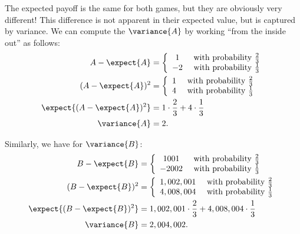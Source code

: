 The expected payoff is the same for both games, but they are obviously
very different!  This difference is not apparent in their expected value,
but is captured by variance.  We can compute the $\variance{A}$ by working
``from the inside out'' as follows:
\begin{align*}
A - \expect{A}
        & =     \left\{
                \begin{array}{cl}
                        1 & \text{ with probability } \frac{2}{3} \\
                        -2 & \text{ with probability } \frac{1}{3}
                \end{array}
                \right. \\
(A - \expect{A})^2
        & =     \left\{
                \begin{array}{cl}
                        1 & \text{ with probability } \frac{2}{3} \\
                        4 & \text{ with probability } \frac{1}{3}
                \end{array}
                \right. \\
\expect{(A - \expect{A})^2}
        & =     1 \cdot \frac{2}{3} + 4 \cdot \frac{1}{3} \\
\variance{A} & =  2.
\end{align*}

Similarly, we have for $\variance{B}$:
\begin{align*}
B - \expect{B}
        & =     \left\{
                \begin{array}{cl}
                        1001 & \text{ with probability } \frac{2}{3} \\
                        -2002 & \text{ with probability } \frac{1}{3}
                \end{array}
                \right. \\
(B - \expect{B})^2
        & =     \left\{
                \begin{array}{cl}
                        1,002,001 & \text{ with probability } \frac{2}{3} \\
                        4,008,004 & \text{ with probability } \frac{1}{3}
                \end{array}
                \right. \\
\expect{(B - \expect{B})^2}
        & =     1,002,001 \cdot \frac{2}{3} + 4,008,004 \cdot \frac{1}{3} \\
\variance{B} & =   2,004,002.
\end{align*}


